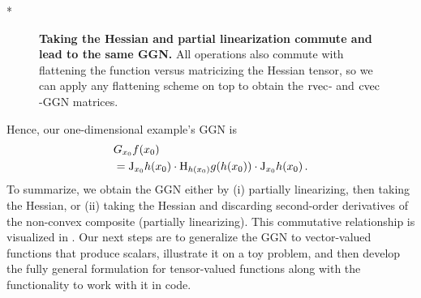 \switchcolumn[1]*
\begin{figure}[!h]
  \centering
  \caption{\textbf{Taking the Hessian and partial linearization commute and lead to the same GGN.}
    All operations also commute with flattening the function versus matricizing the Hessian tensor, so we can apply any flattening scheme on top to obtain the $\operatorname{rvec}$- and $\operatorname{cvec}$-GGN matrices.}\label{fig:commutative-diagram-ggn}
\end{figure}
\switchcolumn[0]

Hence, our one-dimensional example's GGN is
\begin{align*}
  &G_{x_0} f(x_0)
  \\
  &=\mathrm{J}_{x_0} h(x_0) \cdot \mathrm{H}_{h(x_0)} g(h(x_0)) \cdot \mathrm{J}_{x_0} h(x_0)\,.
\end{align*}
To summarize, we obtain the GGN either by (i) partially linearizing, then taking the Hessian, or (ii) taking the Hessian and discarding second-order derivatives of the non-convex composite (\ie partially linearizing).
This commutative relationship is visualized in .
Our next steps are to generalize the GGN to vector-valued functions that produce scalars, illustrate it on a toy problem, and then develop the fully general formulation for tensor-valued functions along with the functionality to work with it in code.

